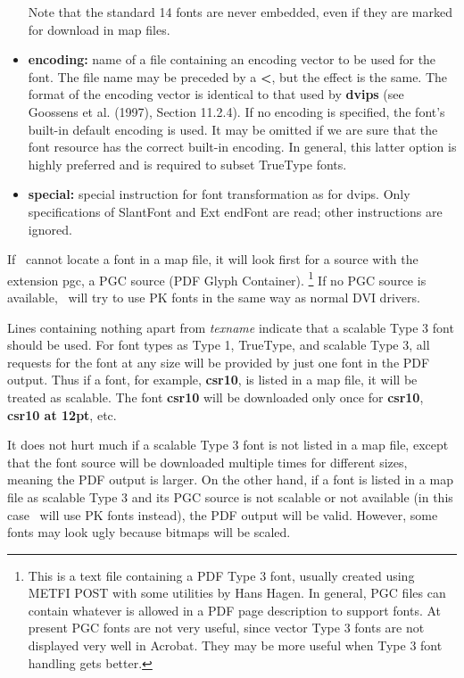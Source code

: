 \begin{itemize}
  Note that the standard 14 fonts are never embedded, even if they are marked 
  for download in map files. 
  
  \item \textbf{encoding:} name of a file containing an encoding vector to be used for the font. 
    The file name may be preceded by a \textbf{<}, but the effect is the same. The format 
    of the encoding vector is identical to that used by \textbf{dvips} (see Goossens et al. 
  (1997), Section 11.2.4). If no encoding is specified, the font's built-in default 
  encoding is used. It may be omitted if we are sure that the font resource has 
  the correct built-in encoding. In general, this latter option is highly preferred 
  and is required to subset TrueType fonts. 
  \item \textbf{special:} special instruction for font transformation as
    for dvips. Only specifications of SlantFont and Ext endFont are read;
    other instructions are ignored. 
\end{itemize}

If \pdfTEX\  cannot locate a font in a map file, it will look first for a source with 
the extension pgc, a PGC source (PDF Glyph Container). \footnote{
This is a text file containing a PDF Type 3 font, usually created using METFI POST with some 
utilities by Hans Hagen. In general, PGC files can contain whatever is allowed in a PDF page description 
to support fonts. At present PGC fonts are not very useful, since vector Type 3 fonts are not displayed 
very well in Acrobat. They may be more useful when Type 3 font handling gets better. 
} If no PGC source is 
available, \pdfTEX\  will try to use PK fonts in the same way as normal DVI drivers. 

Lines containing nothing apart from \emph{texname} indicate that a scalable Type 3 
font should be used. For font types as Type 1, TrueType, and scalable Type 3, all 
requests for the font at any size will be provided by just one font in the PDF output. 
Thus if a font, for example, \textbf{csr10}, is listed in a map file, it will be treated as scalable. 
The font \textbf{csr10} will be downloaded only once for
\textbf{csr10}, \textbf{csr10 at 12pt}, etc. 

It does not hurt much if a scalable Type 3 font is not listed in a map file, except 
that the font source will be downloaded multiple times for different sizes, meaning 
the PDF output is larger. On the other hand, if a font is listed in a map file as scalable 
Type 3 and its PGC source is not scalable or not available (in this case \pdfTEX\  will 
use PK fonts instead), the PDF output will be valid. However, some fonts may look 
ugly because bitmaps will be scaled. 

